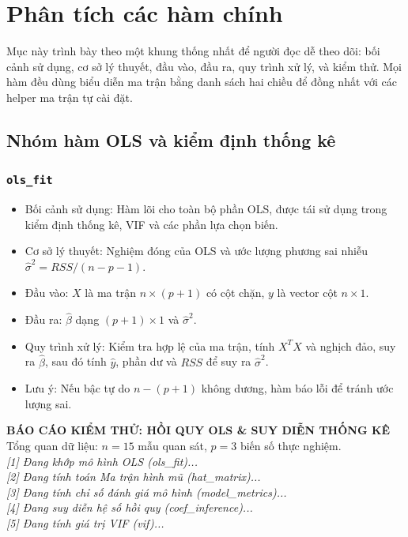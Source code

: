 \documentclass[a4paper]{article}
\newcommand{\code}[1]{\colorbox{light-gray}{\texttt{#1}}}
\begin{document}
\section{Phân tích các hàm chính}

Mục này trình bày theo một khung thống nhất để người đọc dễ theo dõi: bối cảnh sử dụng, cơ sở lý thuyết, đầu vào, đầu ra, quy trình xử lý, và kiểm thử. Mọi hàm đều dùng biểu diễn ma trận bằng danh sách hai chiều để đồng nhất với các helper ma trận tự cài đặt.

\subsection{Nhóm hàm OLS và kiểm định thống kê}

\subsubsection{\code{ols\_fit}}
\begin{itemize}[leftmargin=*]
    \item Bối cảnh sử dụng: Hàm lõi cho toàn bộ phần OLS, được tái sử dụng trong kiểm định thống kê, VIF và các phần lựa chọn biến.
    \item Cơ sở lý thuyết: Nghiệm đóng của OLS và ước lượng phương sai nhiễu $\hat{\sigma}^2 = RSS/(n-p-1)$.
    \item Đầu vào: $X$ là ma trận $n\times(p+1)$ có cột chặn, $y$ là vector cột $n\times1$.
    \item Đầu ra: $\hat{\beta}$ dạng $(p+1)\times1$ và $\hat{\sigma}^2$.
    \item Quy trình xử lý: Kiểm tra hợp lệ của ma trận, tính $X^T X$ và nghịch đảo, suy ra $\hat{\beta}$, sau đó tính $\hat{y}$, phần dư và $RSS$ để suy ra $\hat{\sigma}^2$.
    \item Lưu ý: Nếu bậc tự do $n-(p+1)$ không dương, hàm báo lỗi để tránh ước lượng sai.
\end{itemize}
\begin{mdframed}[backgroundcolor=light-gray, roundcorner=5pt, hidealllines=true]
\textbf{BÁO CÁO KIỂM THỬ: HỒI QUY OLS \& SUY DIỄN THỐNG KÊ} \\
Tổng quan dữ liệu: $n = 15$ mẫu quan sát, $p = 3$ biến số thực nghiệm. \\
\textit{[1] Đang khớp mô hình OLS (ols\_fit)...} \\
\textit{[2] Đang tính toán Ma trận hình mũ (hat\_matrix)...} \\
\textit{[3] Đang tính chỉ số đánh giá mô hình (model\_metrics)...} \\
\textit{[4] Đang suy diễn hệ số hồi quy (coef\_inference)...} \\
\textit{[5] Đang tính giá trị VIF (vif)...}
\end{mdframed}
\end{document}
